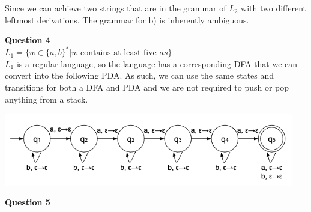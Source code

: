 \documentclass{article}
\begin{document}
Since we can achieve two strings that are in the grammar of $L_2$ with two different leftmost derivations. The grammar for b) is inherently ambiguous.

\bigskip
{\bf Question 4}\\
$L_1 = \{w \in \{a,b\}^* | w \text{ contains at least five } as \}$\\
$L_1$ is a regular language, so the language has a corresponding DFA that we can convert into the following PDA. As such, we can use the same states and transitions for both a DFA and PDA and we are not required to push or pop anything from a stack.
\begin{center}
    \includegraphics[width=0.95\textwidth]{4.png}
\end{center}

{\bf Question 5}\\
\end{document}
